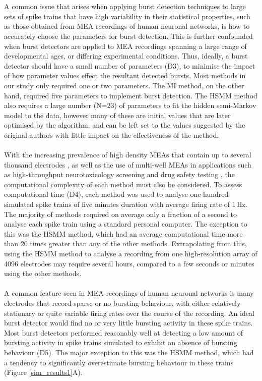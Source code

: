 \documentclass[12pt, titlepage]{article}
\begin{document}
	\\ \\ A common issue that arises when applying burst detection techniques to large sets of spike trains that have high variability in their statistical properties, such as those obtained from MEA recordings of human neuronal networks, is how to accurately choose the parameters for burst detection. This is further confounded when burst detectors are applied to MEA recordings spanning a large range of developmental ages, or differing experimental conditions. Thus, ideally, a burst detector should have a small number of parameters (D3), to minimise the impact of how parameter values effect the resultant detected bursts. Most methods in our study only required one or two parameters. The MI method, on the other hand, required five parameters to implement burst detection. The HSMM method also requires a large number (N=23) of parameters to fit the hidden semi-Markov model to the data, however many of these are initial values that are later optimised by the algorithm, and can be left set to the values suggested by the original authors with little impact on the effectiveness of the method. 
	\\ \\ With the increasing prevalence of high density MEAs that contain up to several thousand electrodes \cite{Maccione2014}, as well as the use of multi-well MEAs in applications such as high-throughput neurotoxicology screening \cite{Valdivia2014,Nicolas2014} and drug safety testing \cite{Gilchrist2015}, the computational complexity of each method must also be considered. To assess computational time (D4), each method was used to analyse one hundred simulated spike trains of five minutes duration with average firing rate of 1$\,$Hz. The majority of methods required on average only a fraction of a second to analyse each spike train using a standard personal computer. The exception to this was the HSMM method, which had an average computational time more than 20 times greater than any of the other methods. Extrapolating from this, using the HSMM method to analyse a recording from one high-resolution array of 4096 electrodes may require several hours, compared to a few seconds or minutes using the other methods.
	\\ \\ A common feature seen in MEA recordings of human neuronal networks is many electrodes that record sparse or no bursting behaviour, with either relatively stationary or quite variable firing rates over the course of the recording. An ideal burst detector would find no or very little bursting activity in these spike trains. Most burst detectors performed reasonably well at detecting a low amount of bursting activity in spike trains simulated to exhibit an absence of bursting behaviour (D5). The major exception to this was the HSMM method, which had a tendency to significantly overestimate bursting behaviour in these trains (Figure \ref{sim_results1}A). 
\end{document}
